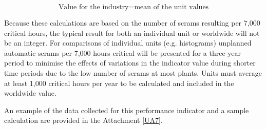 $$ \text{Value for the industry} = \text{mean of the unit values} $$

Because these calculations are based on the number of scrams resulting
per 7,000 critical hours, the typical result for both an individual
unit or worldwide will not be an integer.  For comparisons of
individual units (e.g. histograms) unplanned automatic scrams per
7,000 hours critical will be presented for a three-year period to
minimise the effects of variations in the indicator value during
shorter time periods due to the low number of scrams at most
plants. Units must average at least 1,000 critical hours per year to
be calculated and included in the worldwide value.

An example of the data collected for this performance indicator and a
sample calculation are provided in the Attachment \ref{UA7}.

